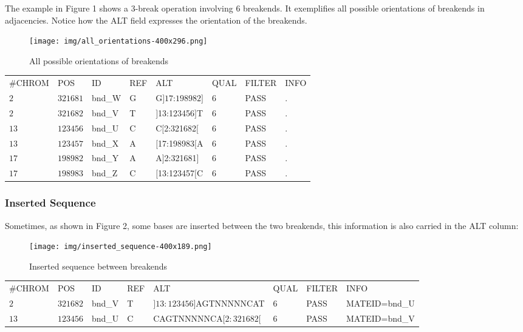 \documentclass[8pt]{article}
\begin{document}
The example in Figure 1 shows a 3-break operation involving 6 breakends.
It exemplifies all possible orientations of breakends in adjacencies.
Notice how the ALT field expresses the orientation of the breakends.

\begin{figure}[ht]
\centering
\texttt{[image: img/all\_orientations-400x296.png]}
\caption{All possible orientations of breakends}
\end{figure}

\vspace{0.3cm}
\begin{tabular}{ l l l l l l l l }
\#CHROM &POS & ID & REF & ALT & QUAL & FILTER & INFO \\
$2$ & $321681$ & bnd\_W & G & G$]17$:$198982]$ & $6$ & PASS & . \\
$2$ & $321682$ & bnd\_V & T & $]$13:123456$]$T & 6 & PASS & . \\
$13$ & $123456$ & bnd\_U & C & C$[$2:321682$[$ & 6 & PASS & . \\
$13$ & $123457$ & bnd\_X & A & $[$17:198983$[$A & 6 & PASS & . \\
$17$ & $198982$ & bnd\_Y & A & A$]$2:321681$]$ & 6 & PASS & . \\
$17$ & $198983$ & bnd\_Z & C & $[$13:123457$[$C & 6 & PASS & . \\
\end{tabular}

\subsubsection{Inserted Sequence}

Sometimes, as shown in Figure 2, some bases are inserted between the two breakends, this information is also carried in the ALT column:

\begin{figure}[h]
\centering
\texttt{[image: img/inserted\_sequence-400x189.png]}
\caption{Inserted sequence between breakends}
\end{figure}

\vspace{0.3cm}
\footnotesize
\begin{tabular}{ l l l l l l l l }
\#CHROM & POS & ID & REF & ALT & QUAL & FILTER & INFO \\
$2$ & $321682$ & bnd\_V & T & $]13:123456]$AGTNNNNNCAT & $6$ & PASS & MATEID=bnd\_U \\
$13$ & $123456$ & bnd\_U & C & CAGTNNNNNCA$[2:321682[$ & $6$ & PASS & MATEID=bnd\_V \\
\end{tabular}
\normalsize
\vspace{0.3cm}
\end{document}
